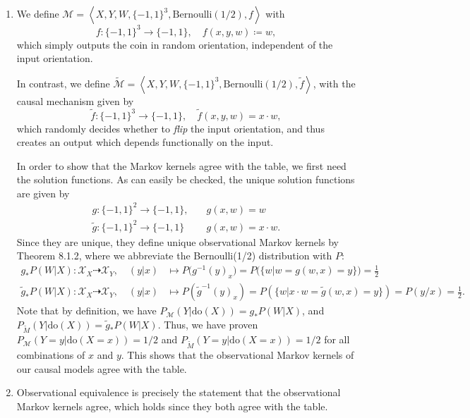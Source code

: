   \begin{gradedsolution}
    \begin{enumerate}
      \item We define $\mathcal{M} = \left\langle X, Y, W, \{-1,1\}^3, \text{Bernoulli}(1/2), f \right\rangle$ with 
	\begin{equation*}
	  f: \{-1,1\}^3 \to \{-1,1\}, \quad f(x, y, w) \coloneq w,
	\end{equation*}
	which simply outputs the coin in random orientation, independent of the input orientation.

	In contrast, we define $\widetilde{\mathcal{M}} = \left\langle X, Y, W, \{-1,1\}^3, \text{Bernoulli}(1/2), \widetilde{f} \right\rangle$, with the causal mechanism given by
	\begin{equation*}
	  \widetilde{f}: \{-1,1\}^3 \to \{-1,1\}, \quad \widetilde{f}(x, y, w) = x \cdot w,
	\end{equation*}
	which randomly decides whether to \emph{flip} the input orientation, and thus creates an output which depends functionally on the input.

	In order to show that the Markov kernels agree with the table, we first need the solution functions. 
	As can easily be checked, the unique solution functions are given by
	\begin{align*}
	  g: \{-1,1\}^2 \to \{-1,1\}, & \quad g(x, w) = w \\
	  \widetilde{g}: \{-1,1\}^2 \to \{-1,1\} & \quad g(x, w) = x \cdot w.
	\end{align*}
	Since they are unique, they define unique observational Markov kernels by Theorem 8.1.2, where we abbreviate the Bernoulli(1/2) distribution with $P$:
	\begin{align*}
	  g_{*}P(W | X): \mathcal{X}_X \dashrightarrow \mathcal{X}_Y, \quad (y | x) & \mapsto P\big(g^{-1}(y)_x\big) = P\big(\{w | w = g(w,x) = y\}\big) = \frac{1}{2} \\
	  \widetilde{g}_{*}P(W | X): \mathcal{X}_X \dashrightarrow \mathcal{X}_Y, \quad (y | x) & \mapsto P\left(\widetilde{g}^{-1}(y)_x\right) = P\left(\{w | x \cdot w = \widetilde{g}(w, x) = y \}\right) = P\left(y/x\right) = \frac{1}{2}.
	\end{align*}
	Note that by definition, we have $P_{\mathcal{M}}(Y | \text{do}(X)) = g_{*}P(W | X)$, and $P_{\widetilde{M}}(Y | \text{do}(X)) = \widetilde{g}_{*}P(W | X)$.
	Thus, we have proven $P_{\mathcal{M}}(Y = y | \text{do}(X = x)) = 1/2$ and $P_{\widetilde{M}}(Y = y | \text{do}(X = x)) = 1/2$ for all combinations of $x$ and $y$.
	This shows that the observational Markov kernels of our causal models agree with the table.
      \item Observational equivalence is precisely the statement that the observational Markov kernels agree, which holds since they both agree with the table.


\end{enumerate}
\end{gradedsolution}
